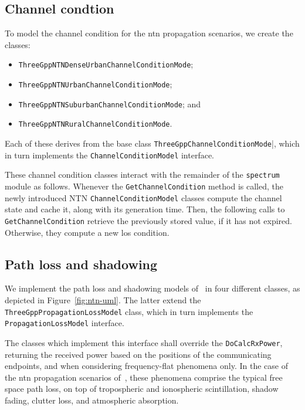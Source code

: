 \subsection{Channel condtion}
To model the channel condition for the \gls{ntn} propagation scenarios, we create the classes: 
\begin{itemize}
    \item \verb|ThreeGppNTNDenseUrbanChannelConditionMode|;
    \item \verb|ThreeGppNTNUrbanChannelConditionMode|;
    \item \verb|ThreeGppNTNSuburbanChannelConditionMode|; and
    \item \verb|ThreeGppNTNRuralChannelConditionMode|.
\end{itemize}
Each of these derives from the base class \texttt{Three\-Gpp\-Channel\-Condition\-Mode}|, which in turn implements the \texttt{Channel\-Condition\-Model} interface.

These channel condition classes interact with the remainder of the \texttt{spectrum} module as follows.
Whenever the \texttt{Get\-Channel\-Condition} method is called, the newly introduced NTN \texttt{Channel\-Condition\-Model} classes compute the channel state and cache it, along with its generation time. Then, the following calls to \texttt{Get\-Channel\-Condition} retrieve the previously stored value, if it has not expired. Otherwise, they compute a new \gls{los} condition. 

\subsection{Path loss and shadowing}
We implement the path loss and shadowing models of~\cite{38811} in four different classes, as depicted in Figure~\ref{fig:ntn-uml}. The latter extend the \texttt{Three\-Gpp\-Propagation\-Loss\-Model} class, which in turn implements the \texttt{Propagation\-Loss\-Model} interface.

The classes which implement this interface shall override the \texttt{Do\-Calc\-Rx\-Power}, returning the received power based on the positions of the communicating endpoints, and when considering frequency-flat phenomena only. 
In the case of the \gls{ntn} propagation scenarios of~\cite{38811}, these phenomena comprise the typical free space path loss, on top of tropospheric and ionospheric scintillation, shadow fading, clutter loss, and atmospheric absorption.


